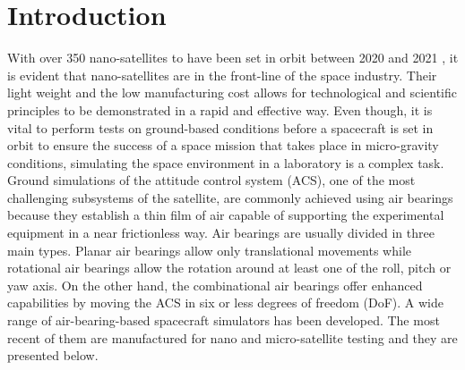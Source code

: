 \documentclass[aerospace,article,submit,moreauthors,dvi2pdf]{Definitions/mdpi}
\begin{document}

\section{Introduction}

With over 350 nano-satellites to have been set in orbit between 2020 and 2021 \cite{nanosats}, it is evident that nano-satellites are in the front-line of the space industry. Their light weight and the low manufacturing cost allows for technological and scientific principles to be demonstrated in a rapid and effective way. Even though, it is vital to perform tests on ground-based conditions before a spacecraft is set in orbit to ensure the success of a space mission that takes place in micro-gravity conditions, simulating the space environment in a laboratory is a complex task. Ground simulations of the attitude control system (ACS), one of the most challenging subsystems of the satellite, are commonly achieved using air bearings because they establish a thin film of air capable of supporting the experimental equipment in a near frictionless way. Air bearings are usually divided in three main types. Planar air bearings allow only translational movements while rotational air bearings allow the rotation around at least one of the roll, pitch or yaw axis. On the other hand, the combinational air bearings offer enhanced capabilities by moving the ACS in six or less degrees of freedom (DoF). 
A wide range of air-bearing-based spacecraft simulators has been developed. The most recent of them are manufactured for nano and micro-satellite testing and they are presented below. 
\end{document}
